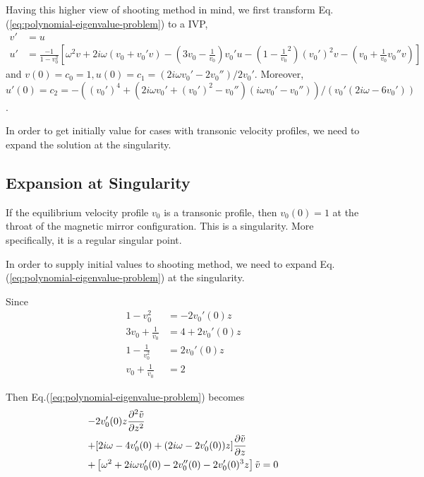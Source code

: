Having this higher view of shooting method in mind, we first transform Eq.(\ref{eq:polynomial-eigenvalue-problem}) to a IVP,
\begin{align*}
    v' & = u                        \\
    u' & = \frac{-1}{1-v_0^2}\left[
        \omega^2v + 2i\omega(v_0+v_0'v) - \left(3v_0 - \frac{1}{v_0}\right)v_0'u - \left(1-\frac{1}{v_0}^2\right)(v_0')^2v - \left(v_0+\frac{1}{v_0}v_0'' v\right)
        \right]
\end{align*}
and $v(0)=c_0=1,u(0)=c_1=(2i\omega v_0'-2v_0'')/2v_0'$. Moreover, $u'(0)=c_2=-((v_0')^4+(2i\omega v_0' + (v_0')^2 - v_0'')(i\omega v_0' - v_0''))/(v_0'(2i\omega-6v_0'))$.

In order to get initially value for cases with transonic velocity profiles, we need to expand the solution at the singularity.

\subsection{Expansion at Singularity}
If the equilibrium velocity profile $v_0$ is a transonic profile, then $v_0(0) = 1$ at the throat of the magnetic mirror configuration. This is a singularity. More specifically, it is a regular singular point.

In order to supply initial values to shooting method, we need to expand Eq.(\ref{eq:polynomial-eigenvalue-problem}) at the singularity.

Since
\begin{equation}
    \begin{aligned}
        1-v_0^2              & = -2v_0'(0)z    \\
        3v_0 + \frac{1}{v_0} & = 4 + 2v_0'(0)z \\
        1-\frac{1}{v_0^2}    & = 2v_0'(0)z     \\
        v_0 + \frac{1}{v_0}  & = 2
    \end{aligned}
\end{equation}

Then Eq.(\ref{eq:polynomial-eigenvalue-problem}) becomes
\begin{equation}
    \begin{aligned}
        - & 2v_0'(0)z\pdv[2]{\tilde{v}}{z}                                              \\
        + & [2i\omega - 4v_0'(0) + (2i\omega - 2v_0'(0))z]\pdv{\tilde{v}}{z}            \\
        + & \left[\omega^2 + 2i\omega v_0'(0) - 2v_0''(0) - 2v_0'(0)^3z\right]\tilde{v}
        = 0
    \end{aligned}
    \label{eq:perturbed-equation-full}
\end{equation}

